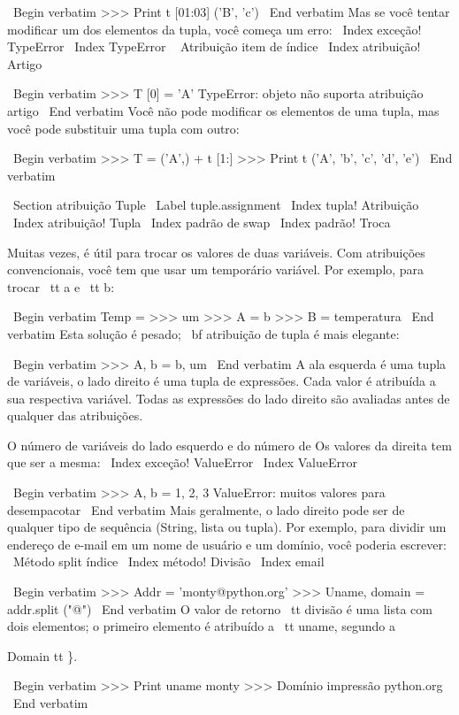 \documentclass[10pt]{book}
\begin{document}
{{{{{{{\ Begin {verbatim}
>>> Print t [01:03]
('B', 'c')
\ End {verbatim}
%
Mas se você tentar modificar um dos elementos da tupla, você começa
um erro:
\ Index {exceção! TypeError}
\ Index {} TypeError
\ {} Atribuição item de índice
\ Index {atribuição! Artigo}

\ Begin {verbatim}
>>> T [0] = 'A'
TypeError: objeto não suporta atribuição artigo
\ End {verbatim}
%
Você não pode modificar os elementos de uma tupla, mas você pode substituir
uma tupla com outro:

\ Begin {verbatim}
>>> T = ('A',) + t [1:]
>>> Print t
('A', 'b', 'c', 'd', 'e')
\ End {verbatim}
%

\ Section {atribuição Tuple}
\ Label {} tuple.assignment
\ Index {tupla! Atribuição}
\ Index {atribuição! Tupla}
\ Index {padrão de swap}
\ Index {padrão! Troca}

Muitas vezes, é útil para trocar os valores de duas variáveis.
Com atribuições convencionais, você tem que usar um temporário
variável. Por exemplo, para trocar {\ tt a} e {\ tt b}:

\ Begin {verbatim}
Temp = >>> um
>>> A = b
>>> B = temperatura
\ End {verbatim}
%
Esta solução é pesado; {\ bf atribuição de tupla} é mais elegante:

\ Begin {verbatim}
>>> A, b = b, um
\ End {verbatim}
%
A ala esquerda é uma tupla de variáveis, o lado direito é uma tupla de
expressões. Cada valor é atribuída a sua respectiva variável.  
Todas as expressões do lado direito são avaliadas antes de qualquer
das atribuições.

O número de variáveis ​​do lado esquerdo e do número de
Os valores da direita tem que ser a mesma:
\ Index {exceção! ValueError}
\ Index {} ValueError

\ Begin {verbatim}
>>> A, b = 1, 2, 3
ValueError: muitos valores para desempacotar
\ End {verbatim}
%
Mais geralmente, o lado direito pode ser de qualquer tipo de sequência
(String, lista ou tupla). Por exemplo, para dividir um endereço de e-mail
em um nome de usuário e um domínio, você poderia escrever:
\ {Método split} índice
\ Index {método! Divisão}
\ Index {email}

\ Begin {verbatim}
>>> Addr = 'monty@python.org'
>>> Uname, domain = addr.split ("@")
\ End {verbatim}
%
O valor de retorno {\ tt divisão} é uma lista com dois elementos;
o primeiro elemento é atribuído a {\ tt uname}, segundo a
{Domain tt \}.

\ Begin {verbatim}
>>> Print uname
monty
>>> Domínio impressão
python.org
\ End {verbatim}
%

}}}}}}}}
\end{document}
